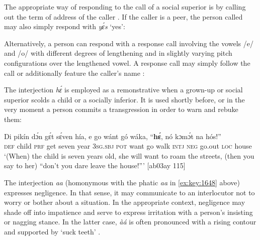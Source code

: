 The appropriate way of responding to the call of a social superior is by calling out the term of address of the caller . If the caller is a peer, the person called may also simply respond with \textit{yɛ́s} ‘yes’:



\ea%
    \label{ex:key:1652}
\z\z

Alternatively, a person can respond with a response call involving the vowels /e/ and /o/ with different degrees of lengthening and in slightly varying pitch configurations over the lengthened vowel. A response call may simply follow the call or additionally feature the caller’s name :


\ea%
    \label{ex:key:1653}
\z\z

The interjection \textit{hɛ́}  is employed as a remonstrative when a grown-up or social superior scolds a child or a socially inferior. It is used shortly before, or in the very moment a person commits a transgression in order to warn and rebuke them: 


\ea%
    \label{ex:key:1654}
    \gll Di  pikín  dɔ́n  gɛ́t  sɛ́ven  hía,    e    go  wánt  gó  wáka,
“\textbf{hɛ́},  nó  kɔmɔ́t  na  hós!”\\
\textsc{def}  child  \textsc{prf}  get  seven  year    \textsc{3sg.sbj}  \textsc{pot}  want  go  walk
\textsc{intj}  \textsc{neg}  go.out  \textsc{loc}  house\\
\glt ‘(When) the child is seven years old, she will want to roam the streets, 
(then you say to her) “don’t you dare leave the house!”’ [ab03ay 115]
\z

The interjection \textit{aa} (homonymous with the phatic \textit{aa} in \ref{ex:key:1648} above) expresses negligence. In that sense, it may communicate to an interlocutor not to worry or bother about a situation. In the appropriate context, negligence may shade off into impatience and serve to express irritation with a person’s insisting or nagging stance. In the latter case, \textit{àá} is often pronounced with a rising contour and supported by ‘suck teeth’ . 


